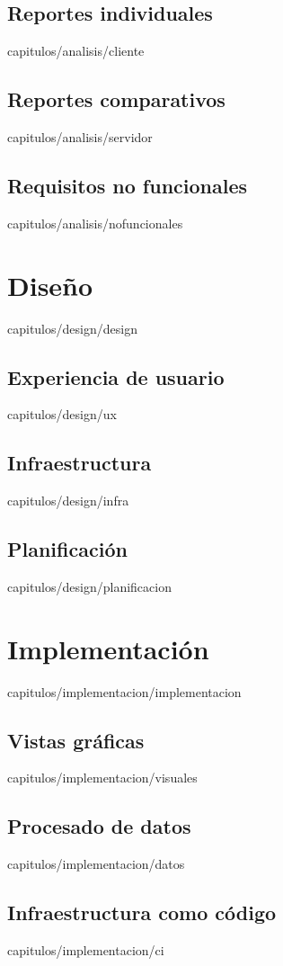 \documentclass[epsbased,copyright,final,printable,covers,extendedindex,firstnumbered,tfg,gnuplot]{thesis}
\begin{document}
  \section{Reportes individuales\label{SEC:CLIENTE}}{capitulos/analisis/cliente}
  \section{Reportes comparativos\label{SEC:SERVIDOR}}{capitulos/analisis/servidor}
  \section{Requisitos no funcionales\label{SEC:NOFUNCIONALES}}{capitulos/analisis/nofuncionales}

\chapter{Diseño\label{CAP:DESIGN}}{capitulos/design/design}
  \section{Experiencia de usuario\label{SEC:UX}}{capitulos/design/ux}
  \section{Infraestructura\label{SEC:INFRA}}{capitulos/design/infra}
  \section{Planificación\label{SEC:PLANIFICACION}}{capitulos/design/planificacion}

\chapter{Implementación\label{CAP:IMPLEMENTACION}}{capitulos/implementacion/implementacion}
  \section{Vistas gráficas\label{SEC:VISUALES}}{capitulos/implementacion/visuales}
  \section{Procesado de datos\label{SEC:DATOS}}{capitulos/implementacion/datos}
  \section{Infraestructura como código\label{SEC:CI}}{capitulos/implementacion/ci}
\end{document}
